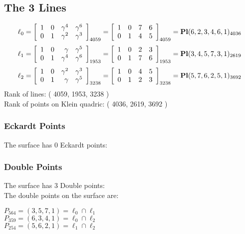 \documentclass{article}
\begin{document}
{\subsection*{The 3 Lines}
$$
\ell_{0} = 
\left[
\begin{array}{*{4}{r}}
1 & 0 & \gamma^{4} & \gamma^{6}\\
0 & 1 & \gamma^{2} & \gamma^{3}\\
\end{array}
\right]
_{4059}
=
\left[
\begin{array}{*{4}c}
1  & 0  & 7  & 6\\
0  & 1  & 4  & 5\\
\end{array}
\right]_{4059}
={\rm\bf Pl}(6,2,3,4,6,1 )_{4036}$$
$$
\ell_{1} = 
\left[
\begin{array}{*{4}{r}}
1 & 0 & \gamma  & \gamma^{5}\\
0 & 1 & \gamma^{4} & \gamma^{6}\\
\end{array}
\right]
_{1953}
=
\left[
\begin{array}{*{4}c}
1  & 0  & 2  & 3\\
0  & 1  & 7  & 6\\
\end{array}
\right]_{1953}
={\rm\bf Pl}(3,4,5,7,3,1 )_{2619}$$
$$
\ell_{2} = 
\left[
\begin{array}{*{4}{r}}
1 & 0 & \gamma^{2} & \gamma^{3}\\
0 & 1 & \gamma  & \gamma^{5}\\
\end{array}
\right]
_{3238}
=
\left[
\begin{array}{*{4}c}
1  & 0  & 4  & 5\\
0  & 1  & 2  & 3\\
\end{array}
\right]_{3238}
={\rm\bf Pl}(5,7,6,2,5,1 )_{3692}$$
Rank of lines: ( 4059, 1953, 3238 )\\
Rank of points on Klein quadric: ( 4036, 2619, 3692 )\\
\subsubsection*{Eckardt Points}
The surface has 0 Eckardt points:\\
\subsubsection*{Double Points}
The surface has 3 Double points:\\
The double points on the surface are:\\
\begin{multicols}{2}
\noindent
$P_{564} = ( 3, 5, 7, 1 ) = \ell_{0} \cap \ell_{1} $\\
$P_{359} = ( 6, 3, 4, 1 ) = \ell_{0} \cap \ell_{2} $\\
$P_{254} = ( 5, 6, 2, 1 ) = \ell_{1} \cap \ell_{2} $\\
\end{multicols}
}
\end{document}
